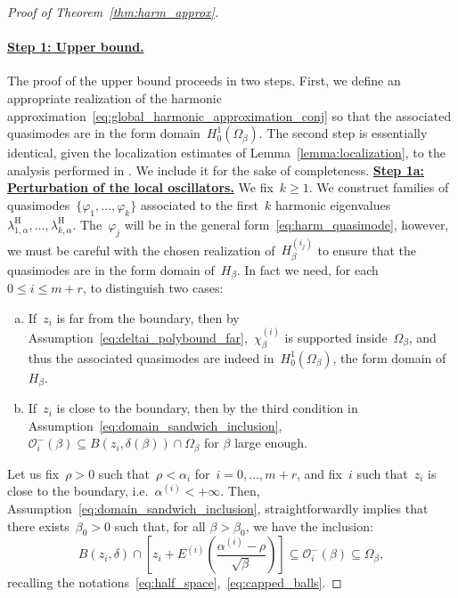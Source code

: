 \documentclass[10pt]{article}
\newcommand{\1}{\mathbbm 1}
\newcommand{\largeRadius}{\delta}
\newcommand{\epsLimit}[1]{\alpha^{(#1)}} %
\newcommand{\localNeighborhood}[2][]{\mathcal{O}_{#2}^{#1}} %
\newcommand{\halfSpace}[1]{E^{(#1)}}
\newcommand{\shift}{\rho} %
\begin{document}
\begin{proof}[Proof of Theorem~\ref{thm:harm_approx}]
        \paragraph{\underline{Step 1: Upper bound.}}
        The proof of the upper bound proceeds in two steps. First, we define an appropriate realization of the harmonic approximation~\eqref{eq:global_harmonic_approximation_conj} so that the associated quasimodes are in the form domain~$H_0^1(\Omega_\beta)$. The second step is essentially identical, given the localization estimates of Lemma~\ref{lemma:localization}, to the analysis performed in \cite{S83,CFKS87}. We include it for the sake of completeness.  
        {\underline{\bf Step 1a: Perturbation of the local oscillators.}\newline}
        We fix~$k\geq 1$. We construct families of quasimodes~$\{\varphi_1,\dots,\varphi_k\}$ associated to the first~$k$ harmonic eigenvalues~$\lambda_{1,\alpha}^{\mathrm H},\dots,\lambda_{k,\alpha}^{\mathrm H}$.
        The~$\varphi_{j}$ will be in the general form~\eqref{eq:harm_quasimode}, however, we must be careful with the chosen realization of~$H_\beta^{(i_j)}$ to ensure that the quasimodes are in the form domain of~$H_\beta$.
        In fact we need, for each~$0\leq i\leq m+r$, to distinguish two cases:
        \begin{enumerate}[a)]
            \item{If~$z_i$ is far from the boundary, then by Assumption~\eqref{eq:deltai_polybound_far},~$\chi_\beta^{(i)}$ is supported inside~$\Omega_\beta$, and thus the associated quasimodes are indeed in~$H_0^1(\Omega_\beta)$, the form domain of~$H_\beta$.}
            \item{If~$z_i$ is close to the boundary, then by the third condition in Assumption~\eqref{eq:domain_sandwich_inclusion},~$\localNeighborhood[-]{i}(\beta)\subseteq B(z_i,\largeRadius(\beta)) \cap \Omega_\beta$ for $\beta$ large enough.}
        \end{enumerate}
        Let us fix~$\shift>0$ such that~$\shift<\alpha_i$ for~$i=0,\dots,m+r$, and fix~$i$ such that~$z_i$ is close to the boundary, i.e.~$\epsLimit{i}<+\infty$. Then, Assumption~\eqref{eq:domain_sandwich_inclusion}, straightforwardly implies that there exists~$\beta_0>0$ such that, for all $\beta>\beta_0$, we have the inclusion:
        \[B(z_i,\largeRadius)\cap \left[z_i + \halfSpace{i}\left(\frac{\epsLimit{i}-\shift}{\sqrt\beta}\right)\right]\subseteq \localNeighborhood[-]{i}(\beta) \subseteq \Omega_\beta,\]
        recalling the notations~\eqref{eq:half_space},~\eqref{eq:capped_balls}.

\end{proof}
\end{document}
